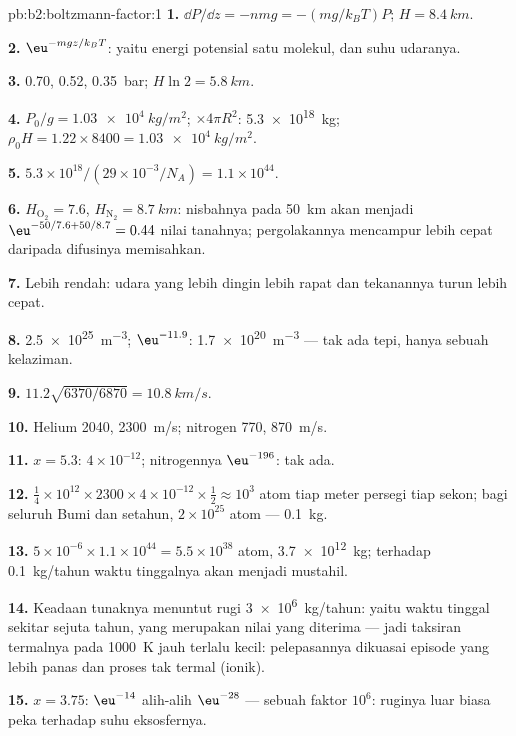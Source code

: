\begin{solution}{pb:b2:boltzmann-factor:1}
\textbf{1.} $\dd P/\dd z = -nmg = -(mg/k_BT)P$; $H = \qty{8.4}{km}$.

\textbf{2.} $\eu^{-mgz/k_BT}$: yaitu energi potensial satu molekul, dan
suhu udaranya.

\textbf{3.} \qty{0.70}{}, \qty{0.52}{}, \qty{0.35}{bar}; $H\ln 2 = \qty{5.8}{km}$.

\textbf{4.} $P_0/g = \qty{1.03e4}{kg/m^2}$; $\times 4\pi R^2$: \qty{5.3e18}{kg}; $\rho_0H =
1.22 \times 8400 = \qty{1.03e4}{kg/m^2}$.

\textbf{5.} $5.3 \times 10^{18}/(29 \times 10^{-3}/N_A) = 1.1 \times 10^{44}$.

\textbf{6.} $H_{\text{O}_2} = 7.6$, $H_{\text{N}_2} = \qty{8.7}{km}$: nisbahnya pada \qty{50}{km}
akan menjadi $\eu^{-50/7.6 + 50/8.7} = 0.44$ nilai tanahnya; pergolakannya mencampur
lebih cepat daripada difusinya memisahkan.

\textbf{7.} Lebih rendah: udara yang lebih dingin lebih rapat dan tekanannya turun lebih cepat.

\textbf{8.} \qty{2.5e25}{m^{-3}}; $\eu^{-11.9}$: \qty{1.7e20}{m^{-3}} --- tak ada tepi, hanya sebuah
kelaziman.

\textbf{9.} $11.2\sqrt{6370/6870} = \qty{10.8}{km/s}$.

\textbf{10.} Helium \qty{2040}{}, \qty{2300}{m/s}; nitrogen \qty{770}{}, \qty{870}{m/s}.

\textbf{11.} $x = 5.3$: $4 \times 10^{-12}$; nitrogennya $\eu^{-196}$: tak ada.

\textbf{12.} $\tfrac14 \times 10^{12} \times 2300 \times 4 \times 10^{-12} \times \tfrac12 \approx
10^3$ atom tiap meter persegi tiap sekon; bagi seluruh Bumi dan setahun,
$2 \times 10^{25}$ atom --- \qty{0.1}{kg}.

\textbf{13.} $5 \times 10^{-6} \times 1.1 \times 10^{44} = 5.5 \times 10^{38}$ atom, \qty{3.7e12}{kg};
terhadap \qty{0.1}{kg/tahun} waktu tinggalnya akan menjadi mustahil.

\textbf{14.} Keadaan tunaknya menuntut rugi \qty{3e6}{kg/tahun}: yaitu waktu
tinggal sekitar sejuta tahun, yang merupakan nilai yang diterima --- jadi
taksiran termalnya pada \qty{1000}{K} jauh terlalu kecil: pelepasannya
dikuasai episode yang lebih panas dan proses tak termal (ionik).

\textbf{15.} $x = 3.75$: $\eu^{-14}$ alih-alih $\eu^{-28}$ --- sebuah faktor $10^6$:
ruginya luar biasa peka terhadap suhu eksosfernya.


\end{solution}

